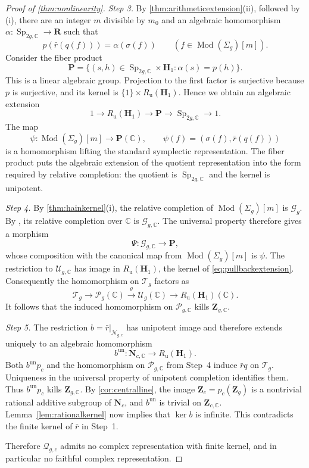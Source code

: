 \documentclass[11pt,a4paper]{article}
\theoremstyle{definition}
\newcommand{\C}{\mathbb C}
\newcommand{\Mod}{\operatorname{Mod}}
\newcommand{\Sp}{\operatorname{Sp}}
\newcommand{\Ru}{R_{\mathrm u}}
\newcommand{\un}{\mathrm{un}}
\begin{document}
\begin{proof}[Proof of \cref{thm:nonlinearity}]
\emph{Step 3.} By \cref{thm:arithmeticextension}(ii), followed by
(i), there are an integer \(m\) divisible by \(m_0\) and an
algebraic homomorphism \(\alpha:\Sp_{2g,\C}\to\mathbf R\)
such that
\[
 p(\bar r(q(f)))=\alpha(\sigma(f))\qquad(f\in \Mod(\Sigma_g)[m]).
\]
Consider the fiber product
\[
 \mathbf P=\{(s,h)\in\Sp_{2g,\C}\times\mathbf H_1:
                       \alpha(s)=p(h)\}.
\]
This is a linear algebraic group. Projection to the first factor is
surjective because \(p\) is surjective, and its kernel is
\(\{1\}\times\Ru(\mathbf H_1)\). Hence we obtain an algebraic
extension
\begin{equation}\label{eq:pullbackextension}
 1\longrightarrow\Ru(\mathbf H_1)\longrightarrow\mathbf P
 \longrightarrow\Sp_{2g,\C}\longrightarrow1.
\end{equation}
The map
\[
 \psi:\Mod(\Sigma_g)[m]\longrightarrow\mathbf P(\C),\qquad
 \psi(f)=(\sigma(f),\bar r(q(f)))
\]
is a homomorphism lifting the standard symplectic representation.
The fiber product puts the algebraic extension of the quotient
representation into the form required by relative completion: the
quotient is \(\Sp_{2g,\C}\) and the kernel is unipotent.

\emph{Step 4.} By \cref{thm:hainkernel}(i), the relative completion
of \(\Mod(\Sigma_g)[m]\) is \(\mathcal G_g\). By \cite[Theorem~3.1]{Hain},
its relative completion over \(\C\) is \(\mathcal G_{g,\C}\).
The universal property therefore gives a morphism
\[
 \Psi:\mathcal G_{g,\C}\longrightarrow\mathbf P,
\]
whose composition with the canonical map from \(\Mod(\Sigma_g)[m]\) is \(\psi\).
The restriction to \(\mathcal U_{g,\C}\) has image in
\(\Ru(\mathbf H_1)\), the kernel of \eqref{eq:pullbackextension}.
Consequently the homomorphism on \(\mathcal{T}_g\) factors as
\[
 \mathcal{T}_g\longrightarrow\mathscr{P}_g(\C)
 \xrightarrow{\theta}\mathcal U_g(\C)
 \longrightarrow\Ru(\mathbf H_1)(\C).
\]
It follows that the induced homomorphism on \(\mathscr{P}_{g,\C}\)
kills \(\mathbf Z_{g,\C}\).

\emph{Step 5.} The restriction \(b=\bar r|_{\mathcal{N}_{g,c}}\) has unipotent
image and therefore extends uniquely to an algebraic homomorphism
\[
 b^{\un}:\mathbf N_{c,\C}\longrightarrow\Ru(\mathbf H_1).
\]
Both \(b^{\un}p_c\) and the homomorphism on
\(\mathscr{P}_{g,\C}\) from Step~4 induce \(\bar r q\) on
\(\mathcal{T}_g\). Uniqueness in the universal property of unipotent
completion identifies them. Thus \(b^{\un}p_c\) kills
\(\mathbf Z_{g,\C}\). By \cref{cor:centralline}, the image
\(\mathbf Z_c=p_c(\mathbf Z_g)\) is a nontrivial rational additive
subgroup of \(\mathbf N_c\), and \(b^{\un}\) is trivial on
\(\mathbf Z_{c,\C}\). Lemma~\ref{lem:rationalkernel} now implies
that \(\ker b\) is infinite. This contradicts the finite kernel of
\(\bar r\) in Step~1.

Therefore \(\mathcal{Q}_{g,c}\) admits no complex representation with finite kernel,
and in particular no faithful complex representation.
\end{proof}
\end{document}
